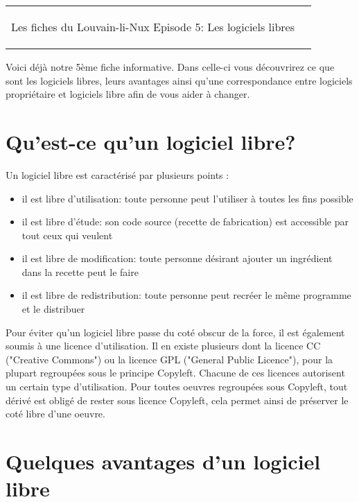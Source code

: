 



\begin{tabular}{p{13cm}r}
	\begin{center}{\Large Les fiches du Louvain-li-Nux\linebreak \linebreak
	\LARGE Episode 5: Les logiciels libres}\end{center}
		&
	\usebox{\logollnux}
\end{tabular}

\vspace*{0.5cm}
Voici déjà notre 5ème fiche informative. Dans celle-ci vous découvrirez ce que sont les logiciels libres, leurs avantages ainsi qu'une correspondance entre logiciels propriétaire et logiciels libre afin de vous aider à changer.

\section*{Qu'est-ce qu'un logiciel libre?}

Un logiciel libre est caractérisé par plusieurs points : 
\begin{itemize}
\item il est libre d'utilisation: toute personne peut l'utiliser à toutes les fins possible
\item il est libre d'étude: son code source (recette de fabrication) est accessible par tout ceux qui veulent
\item il est libre de modification: toute personne désirant ajouter un ingrédient dans la recette peut le faire
\item il est libre de redistribution: toute personne peut recréer le même programme et le distribuer
\end{itemize}

Pour éviter qu'un logiciel libre passe du coté obscur de la force, il est également soumis à une licence d'utilisation. Il en existe plusieurs dont la licence CC ("Creative Commons") ou la licence GPL ("General Public Licence"), pour la plupart regroupées sous le principe Copyleft. Chacune de ces licences autorisent un certain type d'utilisation. Pour toutes oeuvres regroupées sous Copyleft, tout dérivé est obligé de rester sous licence Copyleft, cela permet ainsi de préserver le coté libre d'une oeuvre.

\section*{Quelques avantages d'un logiciel libre}

